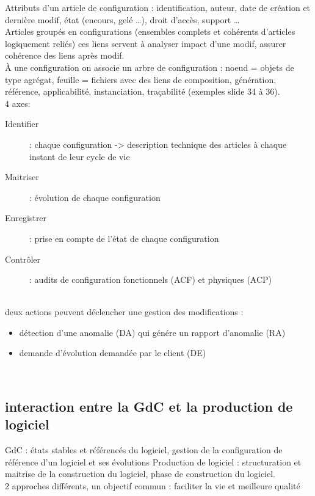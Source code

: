 Attributs d’un article de configuration : identification, auteur, date de création et dernière modif, état (encours, gelé …), droit d’accès, support …\\
Articles groupés en configurations (ensembles complets et cohérents d’articles logiquement reliés) ces liens servent à analyser impact d’une modif, assurer cohérence des liens après modif.\\
À une configuration on associe un arbre de configuration : noeud = objets de type agrégat, feuille = fichiers avec des liens de composition, génération, référence, applicabilité, instanciation, traçabilité (exemples slide 34 à 36).
\hfill\\

4 axes:
	\begin{description}
	\item[Identifier] : chaque configuration -> description technique des articles à chaque instant de leur cycle de vie
	\item[Maitriser] : évolution de chaque configuration
	\item[Enregistrer] : prise en compte de l’état de chaque configuration
	\item[Contrôler] : audits de configuration fonctionnels (ACF) et physiques (ACP)
	\end{description}
\hfill\\

deux actions peuvent déclencher une gestion des modifications :
	\begin{itemize}
	\item détection d’une anomalie (DA) qui génére un rapport d’anomalie (RA)
	\item demande d’évolution demandée par le client (DE)
	\end{itemize}
	\hfill\\

	\subsection{interaction entre la GdC et la production de logiciel}

GdC : états stables et référencés du logiciel, gestion de la configuration de référence d’un logiciel et ses évolutions
Production de logiciel : structuration et maitrise de la construction du logiciel, phase de construction du logiciel.\\

2 approches différents, un objectif commun : faciliter la vie et meilleure qualité

